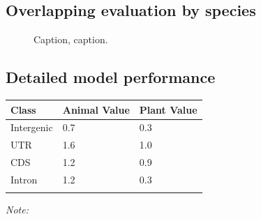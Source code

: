 \documentclass{bioinfo}
\begin{document}
\subsection{Overlapping evaluation by species}
\label{sec:overlapping}
\begin{figure}[!tpb]
\caption{Caption, caption.}\label{fig:animals_overlapping}
\end{figure}


\subsection{Detailed model performance}

\begin{table}[!t]
 {
\begin{tabular}{@{}lll@{}}
\toprule Class & Animal Value & Plant Value \\
\midrule
Intergenic & 0.7 & 0.3 \\
UTR & 1.6 & 1.0 \\
CDS & 1.2 & 0.9 \\
Intron & 1.2 & 0.3 \\
\botrule
\end{tabular}}{{\it Note:} }
\end{table}
\end{document}

